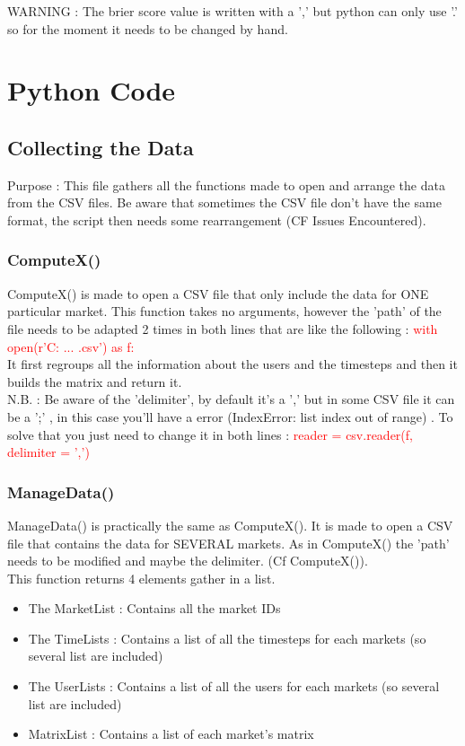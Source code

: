 \documentclass{report}
\begin{document}
WARNING : The brier score value is written with a ',' but python can only use '.' so for the moment it needs to be changed by hand.

\chapter{Python Code}
\section{Collecting the Data}

Purpose : This file gathers all the functions made to open and arrange the data from the CSV files. Be aware that sometimes the CSV file don't have the same format, the script then needs some rearrangement (CF Issues Encountered).

\subsection{ComputeX()}

ComputeX() is made to open a CSV file that only include the data for ONE particular market. This function takes no arguments, however the 'path' of the file needs to be adapted 2 times in both lines that are like the following : \textcolor{red}{with open(r'C: ... .csv') as f:}\\
It first regroups all the information about the users and the timesteps and then it builds the matrix and return it.\\

N.B. : Be aware of the 'delimiter', by default it's a ',' but in some CSV file it can be a ';' , in this case you'll have a error (IndexError: list index out of range) . To solve that you just need to change it in both lines : \textcolor{red}{reader = csv.reader(f, delimiter = ',')}



\subsection{ManageData()}

ManageData() is practically the same as ComputeX(). It is made to open a CSV file that contains the data for SEVERAL markets. As in ComputeX() the 'path' needs to be modified and maybe the delimiter. (Cf ComputeX()).\\

This function returns 4 elements gather in a list. 
\begin{itemize}
\item The MarketList : Contains all the market IDs
\item The TimeLists : Contains a list of all the timesteps for each markets (so several list are included)
\item The UserLists : Contains a list of all the users for each markets (so several list are included)
\item MatrixList : Contains a list of each market's matrix
\end{itemize}
\end{document}
